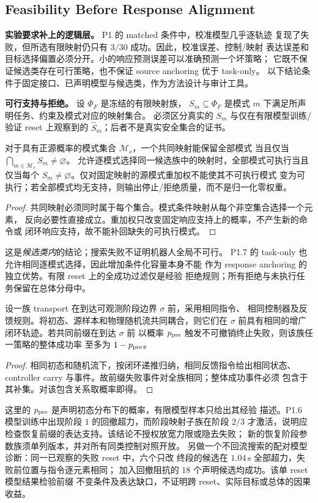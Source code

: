 \subsection{Feasibility Before Response Alignment}
\label{sec:finite-feasibility}
\textbf{实验要求补上的逻辑层。} P1 的 matched 条件中，校准模型几乎逐轨迹
复现了失败，但所选有限映射仍只有 $3/30$ 成功。因此，校准误差、控制/映射
表达误差和目标选择偏置必须分开。小的响应预测误差可以准确预测一个坏策略；
它既不保证候选类存在可行策略，也不保证 source anchoring 优于 task-only。
以下结论条件于固定接口、已声明模型与候选类，作为方法设计与审计工具。

\textbf{可行支持与拒绝。} 设 $\Phi_F$ 是冻结的有限映射族，
$S_m\subseteq\Phi_F$ 是模式 $m$ 下满足所声明任务、约束及模式对应的映射集合。
必须区分真实的 $S_m$ 与仅在有限模型训练/验证 reset 上观察到的
$\widehat S_m$；后者不是真实安全集合的证书。
\begin{proposition}
对于具有正源概率的模式集合 $\mathcal M_s$，一个共同映射能保留全部模式
当且仅当 $\bigcap_{m\in\mathcal M_s}S_m\ne\varnothing$。
允许逐模式选择同一候选族中的映射时，全部模式可执行当且仅当每个
$S_m\ne\varnothing$。仅对固定映射的源模式重加权不能使其不可执行模式
变为可执行；若全部模式均无支持，则输出停止/拒绝质量，而不是归一化零权重。
\end{proposition}
\begin{proof}
共同映射必须同时属于每个集合。模式条件映射从每个非空集合选择一个元素，
反向必要性直接成立。重加权只改变固定响应支持上的概率，不产生新的命令或
闭环响应支持，故不能补回缺失的可执行模式。
\end{proof}
这是\emph{候选类内}的结论；搜索失败不证明机器人全局不可行。
P1.7 的 task-only 也允许相同逐模式选择，因此增加条件化容量本身不能
作为 response anchoring 的独立优势。有限 reset 上的全成功过滤仅是经验
拒绝规则；所有拒绝与未执行任务保留在总体分母中。

\begin{proposition}[不变执行前缀的失败上界]
设一族 transport 在到达可观测阶段边界 $\sigma$ 前，采用相同指令、
相同控制器及反馈规则。将初态、源样本和物理随机流共同耦合，则它们在
$\sigma$ 前具有相同的增广闭环轨迹。若共同前缀在到达 $\sigma$ 前
以概率 $p_{\rm pre}$ 触发不可撤销终止失败，则该族任一策略的整体成功率
至多为 $1-p_{\rm pre}$。
\end{proposition}
\begin{proof}
相同初态和随机流下，按闭环递推归纳，相同反馈指令给出相同状态、
controller carry 与事件。故前缀失败事件对全族相同；整体成功事件必须
包含于其补集。对该包含关系取概率即得。
\end{proof}
这里的 $p_{\rm pre}$ 是声明初态分布下的概率，有限模型样本只给出其经验
描述。P1.6 模型训练中出现阶段 $1$ 的回撤超力，而阶段映射子族在阶段 $2/3$
才激活，说明应检查恢复前缀的表达支持。该结论不授权放宽力限或隐去失败；
新的恢复阶段参数族须单列版本，并对所有同类控制对照开放。
另做一个不回流搜索的配对模型诊断：同一已观察的失败 reset 中，六个只改
终段的候选在 $1.04\,\mathrm s$ 全部超力，失败前位置与指令逐元素相同；
加入回撤阻抗的 $18$ 个声明候选均成功。该单 reset 模型结果检验前缀
不变条件及表达缺口，不证明跨 reset、实际目标或总体的因果收益。

